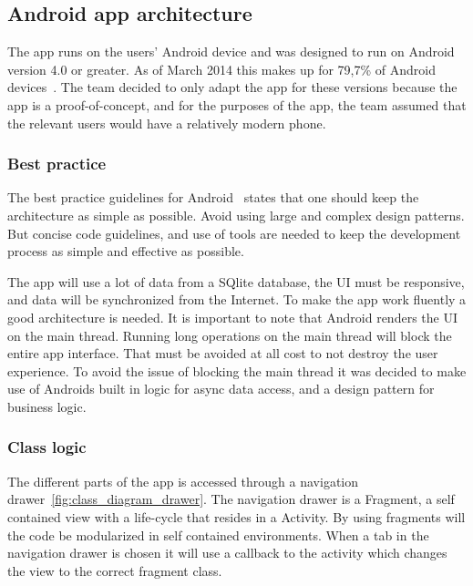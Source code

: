 \subsection{Android app architecture}
The app runs on the users' Android device and was designed to run on Android version 4.0 or greater. As of March 2014 this makes up for 79,7\% of Android devices~\cite{AndroidDeviceFragmentation}. 
The team decided to only adapt the app for these versions because the app is a proof-of-concept, and for the purposes of the app, the team assumed that the relevant users would have a relatively modern phone. 

\subsubsection{Best practice}

The best practice guidelines for Android~\cite{androidPracticePerformance} states that one should keep the architecture as simple as possible. 
Avoid using large and complex design patterns. But concise code guidelines, and use of tools are needed to keep the development process as simple and effective as possible. 

The app will use a lot of data from a SQlite database, the UI must be responsive, and data will be synchronized from the Internet. To make the app work fluently a good architecture is needed. It is important to note that Android renders the UI on the main thread. Running long operations on the main thread will block the entire app interface. That must be avoided at all cost to not destroy the user experience. 
To avoid the issue of blocking the main thread it was decided to make use of Androids built in logic for async data access, and a design pattern for business logic.

\subsubsection{Class logic}


The different parts of the app is accessed through a navigation drawer~\ref{fig:class_diagram_drawer}. The navigation drawer is a Fragment, a self contained view with a life-cycle that resides in a Activity. By using fragments will the code be modularized in self contained environments. When a tab in the navigation drawer is chosen it will use a callback to the activity which changes the view to the correct fragment class. 

